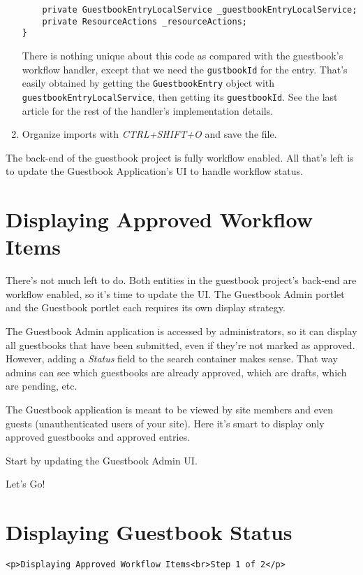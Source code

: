 \begin{enumerate}
\begin{verbatim}
    private GuestbookEntryLocalService _guestbookEntryLocalService;
    private ResourceActions _resourceActions;
}
\end{verbatim}

  There is nothing unique about this code as compared with the
  guestbook's workflow handler, except that we need the
  \texttt{gustbookId} for the entry. That's easily obtained by getting
  the \texttt{GuestbookEntry} object with
  \texttt{guestbookEntryLocalService}, then getting its
  \texttt{guestbookId}. See the last article for the rest of the
  handler's implementation details.
\item
  Organize imports with \emph{CTRL+SHIFT+O} and save the file.
\end{enumerate}

The back-end of the guestbook project is fully workflow enabled. All
that's left is to update the Guestbook Application's UI to handle
workflow status.

\chapter{Displaying Approved Workflow
Items}\label{displaying-approved-workflow-items}

There's not much left to do. Both entities in the guestbook project's
back-end are workflow enabled, so it's time to update the UI. The
Guestbook Admin portlet and the Guestbook portlet each requires its own
display strategy.

The Guestbook Admin application is accessed by administrators, so it can
display all guestbooks that have been submitted, even if they're not
marked as approved. However, adding a \emph{Status} field to the search
container makes sense. That way admins can see which guestbooks are
already approved, which are drafts, which are pending, etc.

The Guestbook application is meant to be viewed by site members and even
guests (unauthenticated users of your site). Here it's smart to display
only approved guestbooks and approved entries.

Start by updating the Guestbook Admin UI.

Let's Go!{}

\chapter{Displaying Guestbook Status}\label{displaying-guestbook-status}

\begin{verbatim}
<p>Displaying Approved Workflow Items<br>Step 1 of 2</p>
\end{verbatim}

